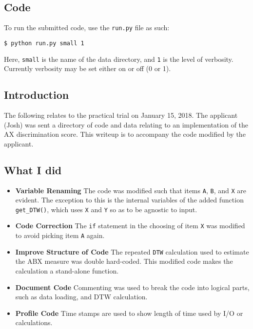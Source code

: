 \documentclass[12pt,a4paper]{article}
\begin{document}
\subsection*{Code}

To run the submitted code, use the \texttt{run.py} file as such:

\texttt{\$ python run.py small 1}

Here, \texttt{small} is the name of the data directory, and \texttt{1} is the level of verbosity. Currently verbosity may be set either on or off (0 or 1).

\subsection*{Introduction}

The following relates to the practical trial on January 15, 2018. The applicant (Josh) was sent a directory of code and data relating to an implementation of the AX discrimination score. This writeup is to accompany the code modified by the applicant.


\subsection*{What I did}

\begin{itemize}
  
\item \textbf{Variable Renaming} The code was modified such that items \texttt{A}, \texttt{B}, and \texttt{X} are evident. The exception to this is the internal variables of the added function \texttt{get\_DTW()}, which uses \texttt{X} and \texttt{Y} so as to be agnostic to input. 

\item \textbf{Code Correction} The \texttt{if} statement in the choosing of item \texttt{X} was modified to avoid picking item \texttt{A} again.

\item \textbf{Improve Structure of Code} The repeated \texttt{DTW} calculation used to estimate the ABX measure was double hard-coded. This modified code makes the calculation a stand-alone function.

\item \textbf{Document Code} Commenting was used to break the code into logical parts, such as data loading, and DTW calculation.

\item \textbf{Profile Code} Time stamps are used to show length of time used by I/O or calculations.

\end{itemize}
\end{document}
